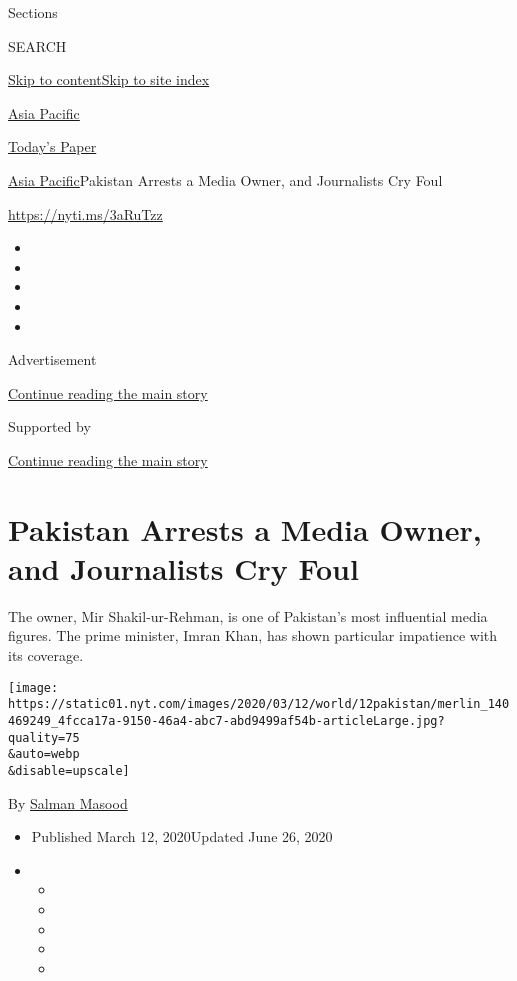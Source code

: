 Sections

SEARCH

\protect\hyperlink{site-content}{Skip to
content}\protect\hyperlink{site-index}{Skip to site index}

\href{https://www.nytimes.com/section/world/asia}{Asia Pacific}

\href{https://myaccount.nytimes.com/auth/login?response_type=cookie\&client_id=vi}{}

\href{https://www.nytimes.com/section/todayspaper}{Today's Paper}

\href{/section/world/asia}{Asia Pacific}\textbar{}Pakistan Arrests a
Media Owner, and Journalists Cry Foul

\url{https://nyti.ms/3aRuTzz}

\begin{itemize}
\item
\item
\item
\item
\item
\end{itemize}

Advertisement

\protect\hyperlink{after-top}{Continue reading the main story}

Supported by

\protect\hyperlink{after-sponsor}{Continue reading the main story}

\hypertarget{pakistan-arrests-a-media-owner-and-journalists-cry-foul}{%
\section{Pakistan Arrests a Media Owner, and Journalists Cry
Foul}\label{pakistan-arrests-a-media-owner-and-journalists-cry-foul}}

The owner, Mir Shakil-ur-Rehman, is one of Pakistan's most influential
media figures. The prime minister, Imran Khan, has shown particular
impatience with its coverage.

\texttt{[image: https://static01.nyt.com/images/2020/03/12/world/12pakistan/merlin\_140469249\_4fcca17a-9150-46a4-abc7-abd9499af54b-articleLarge.jpg?quality=75\\\&auto=webp\\\&disable=upscale]}

By \href{https://www.nytimes.com/by/salman-masood}{Salman Masood}

\begin{itemize}
\item
  Published March 12, 2020Updated June 26, 2020
\item
  \begin{itemize}
  \item
  \item
  \item
  \item
  \item
  \end{itemize}
\end{itemize}

